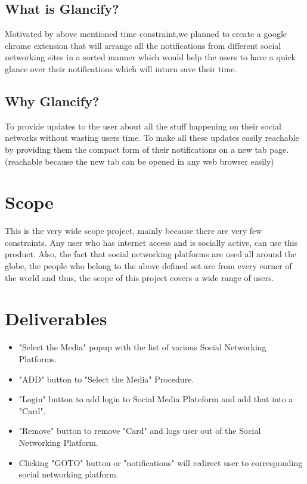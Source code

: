 \documentclass[12pt]{article}
\begin{document}
\subsection{What is Glancify?}
                       Motivated by above mentioned time constraint,we planned to create a google chrome
                         extension that will arrange all the notifications from different social networking sites
                         in a sorted manner which would help the users to have a quick glance over their notifications
                         which will inturn save their time.
\subsection{Why Glancify?}
To provide updates to the user about all the stuff happening on their social networks 
                         without wasting users time.
                       To make all these updates easily reachable by providing them the compact form of their 
                       notifications on a new tab page.(reachable because the new tab can be opened in any web browser
                       easily)
\section{Scope}
This is the very wide scope project, mainly because there are very few
constraints. Any user who has internet access and is socially active, can
use this product. Also, the fact that social networking platforms are used
all around the globe, the people who belong to the above defined set are
from every corner of the world and thus, the scope of this project covers
a wide range of users.

\section{Deliverables}
\begin{itemize}
    \item "Select the Media" popup with the list of various Social Networking Platforms. 
    \item "ADD" button to "Select the Media" Procedure.
    \item "Login" button to add login to Social Media Plateform and add that into a "Card".
    \item "Remove" button to remove "Card" and logs user out of the Social Networking Platform.
    \item Clicking "GOTO" button or "notifications" will redirect user to corresponding social networking platform.
\end{itemize}
\end{document}
